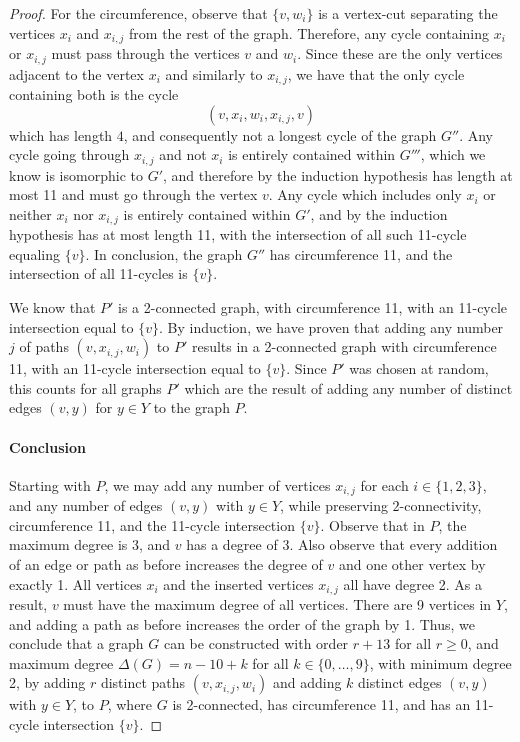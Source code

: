 \begin{proof}
For the circumference, observe that $\{v,w_i\}$ is a vertex-cut separating the vertices $x_i$ and $x_{i,j}$ from the rest of the graph. Therefore, any cycle containing $x_i$ or $x_{i,j}$ must pass through the vertices $v$ and $w_i$. Since these are the only vertices adjacent to the vertex $x_i$ and similarly to $x_{i,j}$, we have that the only cycle containing both is the cycle
\[
(v,x_i,w_i,x_{i,j},v)
\]
which has length $4$, and consequently not a longest cycle of the graph $G''$. Any cycle going through $x_{i,j}$ and not $x_i$ is entirely contained within $G'''$, which we know is isomorphic to $G'$, and therefore by the induction hypothesis has length at most 11 and must go through the vertex $v$. Any cycle which includes only $x_i$ or neither $x_i$ nor $x_{i,j}$ is entirely contained within $G'$, and by the induction hypothesis has at most length 11, with the intersection of all such 11-cycle equaling $\{v\}$. In conclusion, the graph $G''$ has circumference 11, and the intersection of all 11-cycles is $\{v\}$.

We know that $P'$ is a 2-connected graph, with circumference 11, with an 11-cycle intersection equal to $\{v\}$. By induction, we have proven that adding any number $j$ of paths $(v,x_{i,j},w_i)$ to $P'$ results in a 2-connected graph with circumference 11, with an 11-cycle intersection equal to $\{v\}$. Since $P'$ was chosen at random, this counts for all graphs $P'$ which are the result of adding any number of distinct edges $(v,y)$ for $y \in Y$ to the graph $P$.

\paragraph{Conclusion}
Starting with $P$, we may add any number of vertices $x_{i,j}$ for each $i\in\{1,2,3\}$, and any number of edges $(v,y)$ with $y\in Y$, while preserving $2$-connectivity, circumference 11, and the 11-cycle intersection $\{v\}$. Observe that in $P$, the maximum degree is 3, and $v$ has a degree of 3. Also observe that every addition of an edge or path as before increases the degree of $v$ and one other vertex by exactly 1. All vertices $x_i$ and the inserted vertices $x_{i,j}$ all have degree 2. As a result, $v$ must have the maximum degree of all vertices. There are 9 vertices in $Y$, and adding a path as before increases the order of the graph by 1. Thus, we conclude that a graph $G$ can be constructed with order $r + 13$ for all $r \ge 0$, and maximum degree $\Delta(G) = n-10+k$ for all $k \in \{0,\dots,9\}$, with minimum degree 2, by adding $r$ distinct paths $(v,x_{i,j},w_i)$ and adding $k$ distinct edges $(v,y)$ with $y \in Y$, to $P$, where $G$ is 2-connected, has circumference 11, and has an 11-cycle intersection $\{v\}$.

\end{proof}

